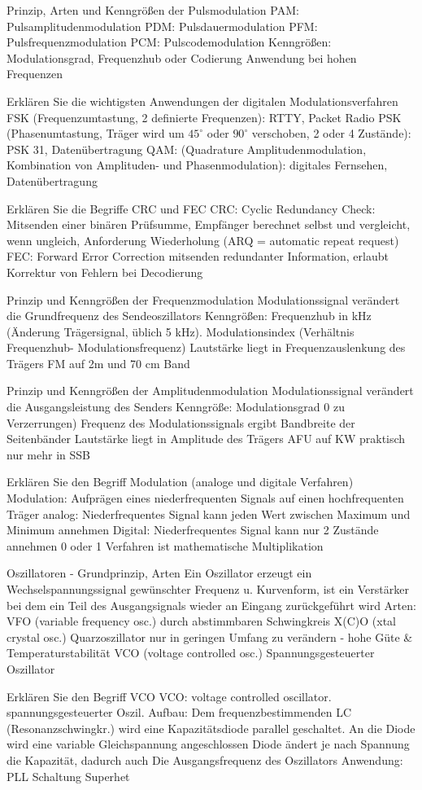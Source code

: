\documentclass[avery5371,grid,frame,a4paper]{flashcards}
\newcommand{\card}[3]{
  \begin{flashcard}[{\chap} -- #1]{#2}#3\end{flashcard}
}
\begin{document}
\card{46}{Prinzip, Arten und Kenngrößen der Pulsmodulation}{
  PAM: Pulsamplitudenmodulation
PDM: Pulsdauermodulation
PFM: Pulsfrequenzmodulation
PCM: Pulscodemodulation
Kenngrößen: Modulationsgrad, Frequenzhub oder Codierung
Anwendung bei hohen Frequenzen 
}
\card{47}{Erklären Sie die wichtigsten Anwendungen der digitalen Modulationsverfahren}{
  FSK (Frequenzumtastung, 2 definierte Frequenzen): RTTY, Packet Radio
  PSK (Phasenumtastung, Träger wird um $45^\circ$ oder $90^\circ$ verschoben, 2 oder 4 Zustände):
  PSK 31, Datenübertragung
  QAM: (Quadrature Amplitudenmodulation, Kombination von Amplituden- und Phasenmodulation): digitales Fernsehen, Datenübertragung
}
\card{48}{Erklären Sie die Begriffe CRC und FEC}{
  CRC: Cyclic Redundancy Check: Mitsenden einer binären
Prüfsumme, Empfänger  berechnet selbst und vergleicht,
wenn ungleich, Anforderung Wiederholung
(ARQ = automatic repeat request)
FEC: Forward Error Correction mitsenden redundanter
Information, erlaubt Korrektur von Fehlern bei
Decodierung
}
\card{49}{Prinzip und Kenngrößen der Frequenzmodulation}{
  Modulationssignal verändert die Grundfrequenz des Sendeoszillators
Kenngrößen:
Frequenzhub in kHz (Änderung Trägersignal, üblich 5 kHz). 
Modulationsindex (Verhältnis Frequenzhub- Modulationsfrequenz)
Lautstärke liegt in Frequenzauslenkung des Trägers
FM auf 2m und 70 cm Band
}
\card{50}{Prinzip und Kenngrößen der Amplitudenmodulation}{
  Modulationssignal verändert die Ausgangsleistung des Senders
Kenngröße: Modulationsgrad 0%
zu Verzerrungen)
Frequenz des Modulationssignals ergibt Bandbreite
der Seitenbänder
Lautstärke liegt in Amplitude des Trägers
AFU auf KW praktisch nur mehr in SSB
}
\card{51}{Erklären Sie den Begriff Modulation (analoge und digitale Verfahren)}{
  Modulation: Aufprägen eines niederfrequenten Signals
auf einen  hochfrequenten Träger
analog: Niederfrequentes Signal kann jeden Wert zwischen 
Maximum und Minimum annehmen
Digital: Niederfrequentes Signal kann nur 2 Zustände annehmen 
0 oder 1 Verfahren ist mathematische Multiplikation
}
\card{52}{Oszillatoren - Grundprinzip, Arten}{
  Ein Oszillator erzeugt ein Wechselspannungssignal gewünschter Frequenz u. Kurvenform, ist ein Verstärker bei dem ein Teil des Ausgangsignals wieder an Eingang zurückgeführt wird
  Arten: VFO (variable frequency osc.) durch abstimmbaren Schwingkreis
  X(C)O (xtal crystal osc.) Quarzoszillator nur in geringen Umfang zu verändern - hohe Güte \& Temperaturstabilität
  VCO (voltage controlled osc.) Spannungsgesteuerter Oszillator
}
\card{53}{Erklären Sie den Begriff VCO}{
  VCO: voltage controlled oscillator. spannungsgesteuerter Oszil.
Aufbau: Dem frequenzbestimmenden LC (Resonanzschwingkr.)  
wird eine Kapazitätsdiode parallel geschaltet. An die Diode wird
eine variable Gleichspannung angeschlossen
Diode ändert je nach Spannung die Kapazität, dadurch auch 
Die Ausgangsfrequenz des Oszillators
Anwendung: PLL Schaltung Superhet
}
\end{document}
